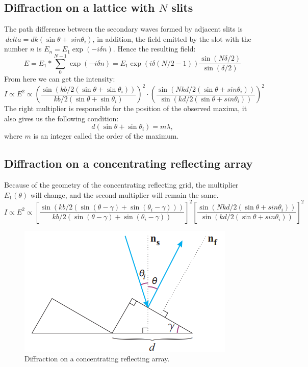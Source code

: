 \documentclass[a4paper, 12pt]{article}
\begin{document}
	\subsection*{Diffraction on a lattice with $N$ slits}
	The path difference between the secondary waves formed by adjacent slits is $ \ delta = d k (\sin{\theta} + \ sin{\theta_i})$, in addition, the field emitted by the slot with the number $n$ is $ E_n = E_1 \exp(-i \delta n)$. Hence the resulting field:
	\begin{equation}
		E = E_1 * \sum_{0}^{N-1} \exp(-i \delta n) = E_1 \exp(i\delta(N/2 - 1)) \frac{\sin(N \delta /2)}{\sin(\delta /2)}
	\end{equation}
	From here we can get the intensity:
	\begin{equation}
		I \propto E^2 \propto (\frac{\sin(k b / 2 (\sin{\theta} + \sin{\theta_i}))}{k b / 2 (\sin{\theta} + \sin{\theta_i})})^2 \cdot (\frac{\sin(N k d / 2 (\sin{\theta} + sin{\theta_i}))}{\sin(k d / 2 (\sin{\theta} + sin{\theta_i}))})^2
	\end{equation}
	The right multiplier is responsible for the position of the observed maxima, it also gives us the following condition:
	\begin{equation}
		d(\sin{\theta} + \sin{\theta_i}) = m \lambda,
	\end{equation}
	where $m$ is an integer called the order of the maximum.
	\subsection*{Diffraction on a concentrating reflecting array}
	Because of the geometry of the concentrating reflecting grid, the multiplier $E_1(\theta)$ will change, and the second multiplier will remain the same.
	\begin{equation}
		I \propto E^2 \propto [\frac{\sin(k b / 2 (\sin(\theta - \gamma) + \sin(\theta_i - \gamma)))}{k b / 2 (\sin(\theta - \gamma) + \sin(\theta_i - \gamma))}]^2 [\frac{\sin(N k d / 2 (\sin{\theta} + sin{\theta_i}))}{\sin(k d / 2 (\sin{\theta} + sin{\theta_i}))}]^2
	\end{equation}
	
	\begin{figure}[H]
		\centering
		\includegraphics[width=0.85\linewidth]{diff2.png}
		\caption{Diffraction on a concentrating reflecting array.}
		\label{fig:2}
	\end{figure}
	
\end{document}
